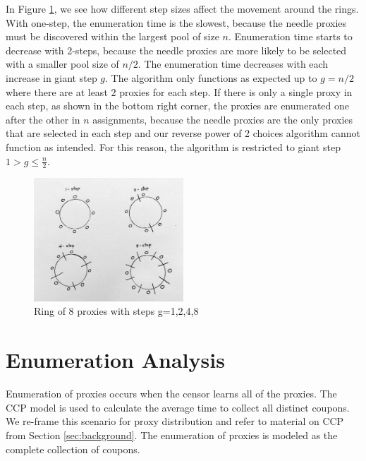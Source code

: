 In Figure \ref{fig:8ring}, we see how different step sizes affect the movement around the rings. With one-step, the enumeration time is the slowest, because the needle proxies must be discovered within the largest pool of size $n$. Enumeration time starts to decrease with 2-steps, because the needle proxies are more likely to be selected with a smaller pool size of $n/2$. The enumeration time decreases with each increase in giant step $g$. The algorithm only functions as expected up to $g=n/2$ where there are at least $2$ proxies for each step. If there is only a single proxy in each step, as shown in the bottom right corner, the proxies are enumerated one after the other in $n$ assignments, because the needle proxies are the only proxies that are selected in each step and our reverse power of 2 choices algorithm cannot function as intended. For this reason, the algorithm is restricted to giant step $1>g\leq \frac{n}{2}$.


\begin{figure}[h!]
\centering
     \includegraphics[width=0.5\textwidth]{fig/8_ring.png}
    \caption{Ring of 8 proxies with steps g=1,2,4,8}

    \label{fig:8ring}
\end{figure}
 
\section{Enumeration Analysis}

Enumeration of proxies occurs when the censor learns all of the proxies. The CCP model is used to calculate the average time to collect all distinct coupons. We re-frame this scenario for proxy distribution and refer to material on CCP from Section \ref{sec:background}. The enumeration of proxies is modeled as the complete collection of coupons. 
 

